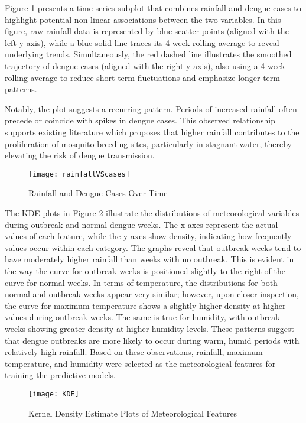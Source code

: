 Figure \ref{fig:rainfallVScases} presents a time series subplot that combines rainfall and dengue cases to highlight potential non-linear associations between the two variables. In this figure, raw rainfall data is represented by blue scatter points (aligned with the left y-axis), while a blue solid line traces its 4-week rolling average to reveal underlying trends. Simultaneously, the red dashed line illustrates the smoothed trajectory of dengue cases (aligned with the right y-axis), also using a 4-week rolling average to reduce short-term fluctuations and emphasize longer-term patterns.

Notably, the plot suggests a recurring pattern. Periods of increased rainfall often precede or coincide with spikes in dengue cases. This observed relationship supports existing literature which proposes that higher rainfall contributes to the proliferation of mosquito breeding sites, particularly in stagnant water, thereby elevating the risk of dengue transmission.

\begin{figure}[ht]
	\centering
	\texttt{[image: rainfallVScases]}
	\caption{Rainfall and Dengue Cases Over Time}
	\label{fig:rainfallVScases}
\end{figure}

The KDE plots in Figure \ref{fig:KDE} illustrate the distributions of meteorological variables during outbreak and normal dengue weeks. The x-axes represent the actual values of each feature, while the y-axes show density, indicating how frequently values occur within each category. The graphs reveal that outbreak weeks tend to have moderately higher rainfall than weeks with no outbreak. This is evident in the way the curve for outbreak weeks is positioned slightly to the right of the curve for normal weeks. In terms of temperature, the distributions for both normal and outbreak weeks appear very similar; however, upon closer inspection, the curve for maximum temperature shows a slightly higher density at higher values during outbreak weeks. The same is true for humidity, with outbreak weeks showing greater density at higher humidity levels. These patterns suggest that dengue outbreaks are more likely to occur during warm, humid periods with relatively high rainfall. Based on these observations, rainfall, maximum temperature, and humidity were selected as the meteorological features for training the predictive models.


\begin{figure}[ht]
	\centering
	\texttt{[image: KDE]}
	\caption{Kernel Density Estimate Plots of Meteorological Features}
	\label{fig:KDE}
\end{figure}

